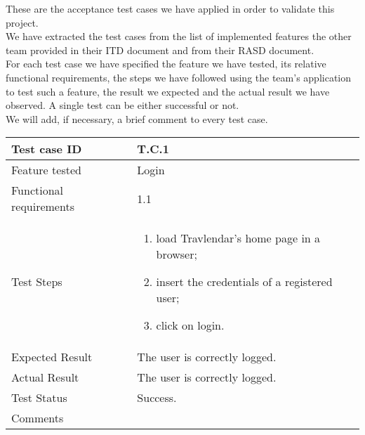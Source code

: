 These are the acceptance test cases we have applied in order to validate this project. \\
We have extracted the test cases from the list of implemented features the other team provided in their ITD document and from their RASD document. \\
For each test case we have specified the feature we have tested, its relative functional requirements, the steps we have followed using the team's application to test such a feature, the result we expected and the actual result we have observed. A single test can be either successful or not.\\
We will add, if necessary, a brief comment to every test case. 
\begin{table}[H]
	\begin{center}
		\begin{tabular}{ | p{} | p{} | }
		\hline
		Test case ID & T.C.1\\
		\hline
		Feature tested & Login  \\
		\hline
		Functional requirements & 1.1  \\
		\hline
		Test Steps & 
			\begin{enumerate}
				\item load Travlendar's home page in a browser;
				\item insert the credentials of a registered user;
				\item click on login.
			\end{enumerate} \\
		\hline
		Expected Result & The user is correctly logged.\\
		\hline
		Actual Result & The user is correctly logged.\\ 
		\hline
		Test Status & \color{ForestGreen}Success.\\ 
		\hline
		Comments & \\ 
		\hline
		\end{tabular}
	\end{center}
\end{table}

